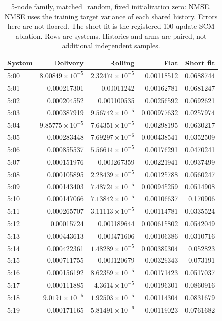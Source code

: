 \begin{table}[ht]
\centering\scriptsize
\begin{tabular}{lrrrr}
\toprule
System & Delivery & Rolling & Flat & Short fit\\
\midrule
5:00 & $8.00849\times10^{-5}$ & $2.32474\times10^{-5}$ & 0.00118512 & 0.0688744\\
5:01 & 0.000217301 & 0.00011242 & 0.00162781 & 0.0681247\\
5:02 & 0.000204552 & 0.000100535 & 0.00256592 & 0.0692621\\
5:03 & 0.000387919 & $9.56742\times10^{-5}$ & 0.000977632 & 0.0257974\\
5:04 & $9.85775\times10^{-5}$ & $7.64351\times10^{-5}$ & 0.00298195 & 0.0630217\\
5:05 & 0.000283448 & $7.69297\times10^{-6}$ & 0.000438541 & 0.0352509\\
5:06 & 0.000855537 & $5.56614\times10^{-5}$ & 0.00176291 & 0.0470241\\
5:07 & 0.000151976 & 0.000267359 & 0.00221941 & 0.0937499\\
5:08 & 0.000105895 & $2.28439\times10^{-5}$ & 0.00125788 & 0.0560247\\
5:09 & 0.000143403 & $7.48724\times10^{-5}$ & 0.000945259 & 0.0514908\\
5:10 & 0.000147066 & $7.13842\times10^{-5}$ & 0.00106637 & 0.170906\\
5:11 & 0.000265707 & $3.11113\times10^{-5}$ & 0.00114781 & 0.0335524\\
5:12 & 0.00015724 & 0.000189644 & 0.000615802 & 0.0542049\\
5:13 & 0.000443613 & 0.000471606 & 0.00106386 & 0.0310716\\
5:14 & 0.000422361 & $1.48289\times10^{-5}$ & 0.000389304 & 0.052823\\
5:15 & 0.000711755 & 0.000120679 & 0.00329343 & 0.073191\\
5:16 & 0.000156192 & $8.62359\times10^{-5}$ & 0.00171423 & 0.0517037\\
5:17 & 0.000111885 & $4.3614\times10^{-5}$ & 0.00196301 & 0.0860916\\
5:18 & $9.0191\times10^{-5}$ & $1.92503\times10^{-5}$ & 0.00114304 & 0.0831679\\
5:19 & 0.000171165 & $5.81491\times10^{-6}$ & 0.00119023 & 0.0761682\\
\bottomrule
\end{tabular}
\caption{5-node family, matched\_random, fixed initialization zero: NMSE. NMSE uses the training target variance of each shared history. Errors here are not floored. The short fit is the registered 100-update SCM ablation. Rows are systems. Histories and arms are paired, not additional independent samples.}
\end{table}
